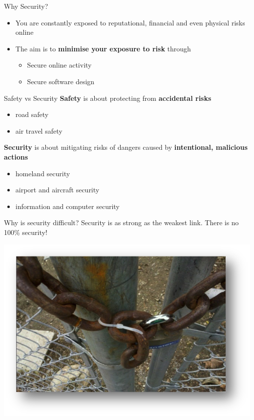 \documentclass{beamer}
\begin{document}
\begin{frame}{Why Security?}
	\begin{itemize}
		\item You are constantly exposed to reputational, financial and even physical risks online
		\item The aim is to \textbf{minimise your exposure to risk} through
        \begin{itemize}
        	\item Secure online activity
            \item Secure software design
        \end{itemize}
	\end{itemize}
\end{frame}

\begin{frame}{Safety vs Security}
\textbf{Safety} is about protecting from \textbf{accidental risks} 
\begin{itemize}
\item road safety
\item  air travel safety
\end{itemize}
\textbf{Security} is about mitigating risks of dangers
caused by \textbf{intentional, malicious actions} 
\begin{itemize}
\item homeland security
\item airport and aircraft security
\item information and computer security
\end{itemize}
\end{frame}

\begin{frame}{Why is security difficult?}
Security is as strong as the weakest link. There is no 100\% security!
\begin{center}
\includegraphics[width=0.8\linewidth]{link.png}
\end{center}
\end{frame}
\end{document}
